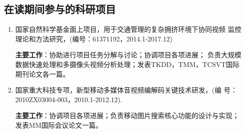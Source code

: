 \documentclass[doctor]{ustcthesis}
\begin{document}
\begin{publications}
    \section*{在读期间参与的科研项目}
    \begin{enumerate}
        \item 国家自然科学基金面上项目，用于交通管理的复杂拥挤环境下协同视频
            监控理论和方法研究，(编号：61371192，2014.1-2017.12)

            \textbf{主要工作}：协助进行项目任务分解与讨论；协调项目各项进展；
            负责大规模数据快速处理和多摄像头视频分析处理；发表TKDD，TMM，TCSVT国际
            期刊论文各一篇。
        \item 国家重大科技专项，新型移动多媒体音视频编解码关键技术研发，(编
            号：2010ZX03004-003，2010.1-2012.12).

            \textbf{主要工作}：协调项目各项进展；负责移动图片搜索核心功能的设计与实现；
            发表MM国际会议论文一篇。
    \end{enumerate}

\end{publications}
\end{document}
